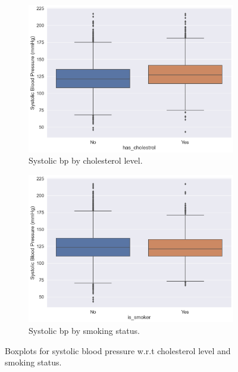 \documentclass[12 pt]{scrartcl}
\numberwithin{equation}{section}
\begin{document}
\begin{figure}[H]
    \centering
    \begin{subfigure}[b]{0.49\textwidth}
        \includegraphics[width=\textwidth]{images/boxplot-cholesterol-sys.png}
        \caption{Systolic bp by cholesterol level.}
        \label{fig:subplot9}
    \end{subfigure}
    \hfill
    \begin{subfigure}[b]{0.49\textwidth}
        \includegraphics[width=\textwidth]{images/boxplot-smoker-sys.png}
        \caption{Systolic bp by smoking status.}
        \label{fig:subplot10}
    \end{subfigure}
    \caption{Boxplots for systolic blood pressure w.r.t cholesterol level and smoking status.}
\end{figure}
\end{document}
